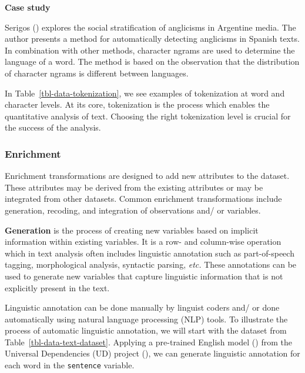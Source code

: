 \documentclass[
  letterpaper,
  krantz1]{latex/krantz-mod}
\theoremstyle{definition}
\theoremstyle{definition}
\theoremstyle{remark}
\begin{document}
\begin{tcolorbox}[enhanced jigsaw, leftrule=.75mm, colframe=quarto-callout-color-frame, left=2mm, colback=white, toprule=.15mm, breakable, arc=.35mm, opacityback=0, bottomrule=.15mm, rightrule=.15mm]

\textbf{ Case study}

Serigos () explores the social
stratification of anglicisms in Argentine media. The author presents a
method for automatically detecting anglicisms in Spanish texts. In
combination with other methods, character ngrams are used to determine
the language of a word. The method is based on the observation that the
distribution of character ngrams is different between languages.

\end{tcolorbox}

In Table~\ref{tbl-data-tokenization}, we see examples of tokenization at
word and character levels. At its core, tokenization is the process
which enables the quantitative analysis of text. Choosing the right
tokenization level is crucial for the success of the analysis.

\subsubsection{Enrichment}\label{enrichment}

Enrichment transformations are designed to add new attributes to the
dataset. These attributes may be derived from the existing attributes or
may be integrated from other datasets. Common enrichment transformations
include generation, recoding, and integration of observations and/ or
variables.

\textbf{Generation} is the process of creating new variables based on
implicit information within existing variables. It is a row- and
column-wise operation which in text analysis often includes linguistic
annotation such as part-of-speech tagging, morphological analysis,
syntactic parsing, \emph{etc.} These annotations can be used to generate
new variables that capture linguistic information that is not explicitly
present in the text.

Linguistic annotation can be done manually by linguist coders and/ or
done automatically using natural language processing (NLP) tools. To
illustrate the process of automatic linguistic annotation, we will start
with the dataset from Table~\ref{tbl-data-text-dataset}. Applying a
pre-trained English model () from the Universal Dependencies (UD) project
(), we can generate linguistic annotation for each word in the
\texttt{sentence} variable.
\end{document}
